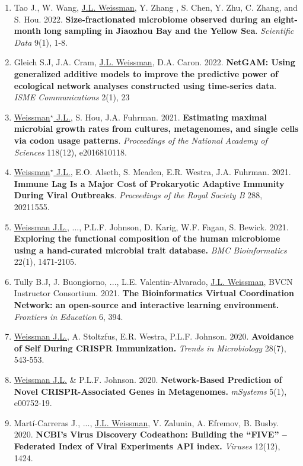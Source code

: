 \documentclass[]{res}
\begin{document}
\begin{resume}
\begin{enumerate}[leftmargin=*]
    \item  Tao J., W. Wang, \underline{J.L. Weissman}, Y. Zhang , S. Chen, Y. Zhu, C. Zhang, and S. Hou. 2022. {\bf Size-fractionated microbiome observed during an eight-month long sampling in Jiaozhou Bay and the Yellow Sea}. \emph{Scientific Data} 9(1), 1-8.
 
 \item Gleich S.J, J.A. Cram, \underline{J.L. Weissman}, D.A. Caron. 2022. {\bf NetGAM: Using generalized additive models to improve the predictive power of ecological network analyses constructed using time-series data}. \emph{ISME Communications} 2(1), 23
 
\item \underline{Weissman$^\star$ J.L.}, S. Hou, J.A. Fuhrman. 2021. {\bf Estimating maximal microbial growth rates from cultures, metagenomes, and single cells via codon usage patterns}. \emph{Proceedings of the National Academy of Sciences} 118(12), e2016810118. 
 
\item \underline{Weissman$^\star$ J.L.}, E.O. Alseth, S. Meaden, E.R. Westra, J.A. Fuhrman. 2021. {\bf Immune Lag Is a Major Cost of Prokaryotic Adaptive Immunity During Viral Outbreaks}. \emph{Proceedings of the Royal Society B} 288, 20211555.

\item \underline{Weissman J.L.}, ..., P.L.F. Johnson, D. Karig, W.F. Fagan, S. Bewick. 2021. {\bf Exploring the functional composition of the human microbiome using a hand-curated microbial trait database.} \emph{BMC Bioinformatics} 22(1), 1471-2105.

\item Tully B.J, J. Buongiorno, ..., L.E. Valentin-Alvarado, \underline{J.L. Weissman}, BVCN Instructor Consortium. 2021. {\bf The Bioinformatics Virtual Coordination Network: an open-source and interactive learning environment.} \emph{Frontiers in Education} 6, 394.

\item \underline{Weissman J.L.}, A. Stoltzfus, E.R. Westra, P.L.F. Johnson. 2020. {\bf Avoidance of Self During CRISPR Immunization.} \emph{Trends in Microbiology} 28(7), 543-553.

\item \underline{Weissman J.L.} \& P.L.F. Johnson. 2020. {\bf Network-Based Prediction of Novel CRISPR-Associated Genes in Metagenomes.} \emph{mSystems} 5(1), e00752-19.

\item Mart\'{i}-Carreras J., ..., \underline{J.L. Weissman}, V. Zalunin, A. Efremov, B. Busby. 2020. {\bf NCBI’s Virus Discovery Codeathon: Building the “FIVE” -- Federated Index of Viral Experiments API index.} \emph{Viruses} 12(12), 1424.
 

\end{enumerate}
\end{resume}
\end{document}
